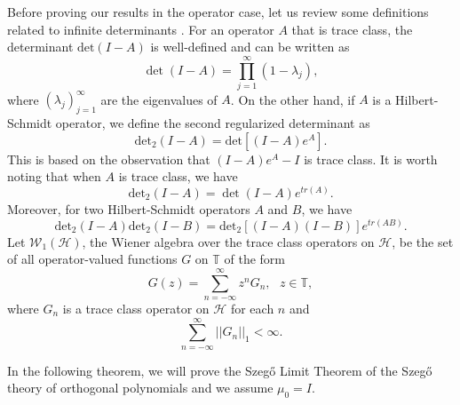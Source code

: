 \documentclass[11pt]{article}
\begin{document}
Before proving our results in the operator case, let us review some definitions related to infinite determinants \cite{Sim1}. For an operator $A$ that is trace class, the determinant $\mathrm{det}(I-A)$ is well-defined and can be written as
$$
\det(I-A)=\prod_{j=1}^{\infty}(1-\lambda_{j}),
$$ 
where $(\lambda_{j})_{j=1}^{\infty}$ are the eigenvalues of $A$.
On the other hand, if $A$ is a Hilbert-Schmidt operator, we define the second regularized determinant as
\[
\mathrm{det}_{2}(I-A)=\mathrm{det}[(I-A)e^{A}].
\] 
This is based on the observation that $(I-A)e^{A}-I$ is trace class. It is worth noting that when $A$ is trace class, we have
\[
\mathrm{det}_{2}(I-A)=\det(I-A)e^{tr(A)}.\]
Moreover, for two Hilbert-Schmidt operators $A$ and $B$, we have
\begin{equation} \label{eq:reg_det}
     \mathrm{det}_{2}(I-A)\mathrm{det}_{2}(I-B)=\mathrm{det}_{2}[(I-A)(I-B)]e^{tr(AB)}.
\end{equation} 
Let $\mathcal{W}_{1}(\mathcal{H})$, the Wiener algebra over the trace class operators on $\mathcal{H}$, be the set of all operator-valued functions $G$ on $\mathbb{T}$ of the form 
\begin{equation}\label{eq:W1_series_expansion}
G(z)=\sum_{n=-\infty}^{\infty}z^{n}G_{n}, ~~~ z \in \mathbb{T},
\end{equation} 
where $G_{n}$ is a trace class operator on $\mathcal{H}$ for each $n$ and 
\begin{equation}\label{eq:W1_space}
    \sum_{n=-\infty}^{\infty}||G_{n}||_{1} < \infty. 
\end{equation}

In the following theorem, we will prove the Szeg\H{o} Limit Theorem of the Szeg\H{o} theory of orthogonal polynomials and we assume $\mu_{0} = I$.
\end{document}
